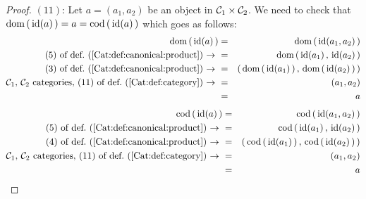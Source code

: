 \begin{proof}
    $(11)$: Let $a=(a_{1},a_{2})$ be an object in $\mbox{${\cal C}_{1}$}\times\mbox{${\cal C}_{2}$}$. We need
    to check that $\mbox{\rm dom}\,(\,\mbox{\rm id}(a)\,)=a=\mbox{\rm cod}\,(\,\mbox{\rm id}(a)\,)$ which goes as
    follows:
        \begin{eqnarray*}\dom\,(\,\id(a)\,)
            &=&\dom\,(\,\id(a_{1},a_{2})\,)\\
            \mbox{$(5)$ of def.~(\ref{Cat:def:canonical:product})\ $\to$\ }
            &=&\dom\,(\,\id(a_{1})\,,\,\id(a_{2})\,)\\
            \mbox{$(3)$ of def.~(\ref{Cat:def:canonical:product})\ $\to$\ }
            &=&(\,\dom\,(\,\id(a_{1})\,)\,,\,\dom\,(\,\id(a_{2})\,)\,)\\
            \mbox{\Cone,\ \Ctwo\ categories, 
                $(11)$ of def.~(\ref{Cat:def:category})\ $\to$\ }
            &=&(a_{1},a_{2})\\
            &=&a
        \end{eqnarray*}
        \begin{eqnarray*}\cod\,(\,\id(a)\,)
            &=&\cod\,(\,\id(a_{1},a_{2})\,)\\
            \mbox{$(5)$ of def.~(\ref{Cat:def:canonical:product})\ $\to$\ }
            &=&\cod\,(\,\id(a_{1})\,,\,\id(a_{2})\,)\\
            \mbox{$(4)$ of def.~(\ref{Cat:def:canonical:product})\ $\to$\ }
            &=&(\,\cod\,(\,\id(a_{1})\,)\,,\,\cod\,(\,\id(a_{2})\,)\,)\\
            \mbox{\Cone,\ \Ctwo\ categories, 
                $(11)$ of def.~(\ref{Cat:def:category})\ $\to$\ }
            &=&(a_{1},a_{2})\\
            &=&a
        \end{eqnarray*}


\end{proof}
